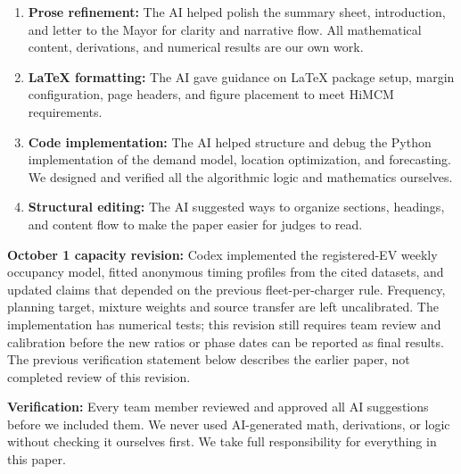\documentclass[12pt]{article}
\begin{document}
\begin{enumerate}
    \item \textbf{Prose refinement:} The AI helped polish the summary sheet, introduction,
    and letter to the Mayor for clarity and narrative flow. All mathematical content,
    derivations, and numerical results are our own work.
    \item \textbf{LaTeX formatting:} The AI gave guidance on LaTeX package setup, margin
    configuration, page headers, and figure placement to meet HiMCM requirements.
    \item \textbf{Code implementation:} The AI helped structure and debug the Python
    implementation of the demand model, location optimization, and forecasting. We
    designed and verified all the algorithmic logic and mathematics ourselves.
    \item \textbf{Structural editing:} The AI suggested ways to organize sections,
    headings, and content flow to make the paper easier for judges to read.
\end{enumerate}

\textbf{October 1 capacity revision:} Codex implemented the registered-EV weekly
occupancy model, fitted anonymous timing profiles from the cited datasets, and updated
claims that depended on the previous fleet-per-charger rule. Frequency, planning target,
mixture weights and source transfer are left uncalibrated. The implementation has
numerical tests; this revision still requires team review and calibration before the
new ratios or phase dates can be reported as final results. The previous verification
statement below describes the earlier paper, not completed review of this revision.

\textbf{Verification:} Every team member reviewed and approved all AI suggestions before
we included them. We never used AI-generated math, derivations, or logic without checking
it ourselves first. We take full responsibility for everything in this paper.
\end{document}
